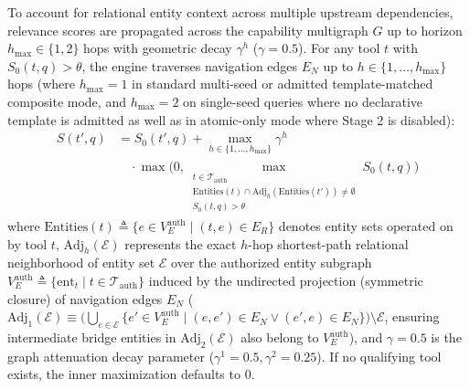 \documentclass[conference,10pt]{IEEEtran}
\begin{document}
To account for relational entity context across multiple upstream dependencies, relevance scores are propagated across the capability multigraph $G$ up to horizon $h_{\max} \in \{1, 2\}$ hops with geometric decay $\gamma^h$ ($\gamma = 0.5$). For any tool $t$ with $S_0(t, q) > \theta$, the engine traverses navigation edges $E_N$ up to $h \in \{1, \dots, h_{\max}\}$ hops (where $h_{\max} = 1$ in standard multi-seed or admitted template-matched composite mode, and $h_{\max} = 2$ on single-seed queries where no declarative template is admitted as well as in atomic-only mode where Stage 2 is disabled):
\begin{equation}
\label{eq:propagation}
\begin{aligned}
S(t', q) &= S_0(t', q) + \max_{h \in \{1, \dots, h_{\max}\}} \gamma^h \\
&\quad \cdot \max\Biggl(0, \max_{\substack{t \in \mathcal{T}_{\text{auth}} \\ \text{Entities}(t) \cap \text{Adj}_h(\text{Entities}(t')) \neq \emptyset \\ S_0(t, q) > \theta}} S_0(t, q)\Biggr)
\end{aligned}
\end{equation}
where $\text{Entities}(t) \triangleq \{e \in V_E^{\text{auth}} \mid (t, e) \in E_R\}$ denotes entity sets operated on by tool $t$, $\text{Adj}_h(\mathcal{E})$ represents the exact $h$-hop shortest-path relational neighborhood of entity set $\mathcal{E}$ over the authorized entity subgraph $V_E^{\text{auth}} \triangleq \{\text{ent}_t \mid t \in \mathcal{T}_{\text{auth}}\}$ induced by the undirected projection (symmetric closure) of navigation edges $E_N$ ($\text{Adj}_1(\mathcal{E}) \equiv \big(\bigcup_{e \in \mathcal{E}} \{e' \in V_E^{\text{auth}} \mid (e, e') \in E_N \lor (e', e) \in E_N\}\big) \setminus \mathcal{E}$, ensuring intermediate bridge entities in $\text{Adj}_2(\mathcal{E})$ also belong to $V_E^{\text{auth}}$), and $\gamma = 0.5$ is the graph attenuation decay parameter ($\gamma^1 = 0.5, \gamma^2 = 0.25$). If no qualifying tool exists, the inner maximization defaults to $0$.
\end{document}
